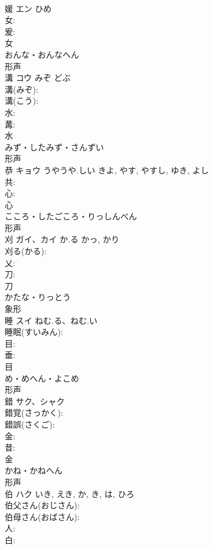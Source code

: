 \documentclass[8pt]{extreport}
\begin{document}
\begin{CJK}{UTF8}{min}
\\	媛	エン	ひめ		
\\	女: 
\\	爰: 
\\	女	
\\	おんな・おんなへん	
\\	形声 
\\	溝	コウ	みぞ	どぶ	
\\	溝(みぞ): 
\\	溝(こう): 
\\	水: 
\\	冓: 
\\	水	
\\	みず・したみず・さんずい	
\\	形声 
\\	恭	キョウ	うやうや.しい	きよ, やす, やすし, ゆき, よし	
\\	共: 
\\	心: 
\\	心	
\\	こころ・したごころ・りっしんべん	
\\	形声 
\\	刈	ガイ、カイ	か.る	かっ, かり	
\\	刈る(かる): 
\\	乂: 
\\	刀: 
\\	刀	
\\	かたな・りっとう	
\\	象形 
\\	睡	スイ	ねむ.る、ねむ.い		
\\	睡眠(すいみん): 
\\	目: 
\\	垂: 
\\	目	
\\	め・めへん・よこめ	
\\	形声 
\\	錯	サク、シャク			
\\	錯覚(さっかく): 
\\	錯誤(さくご): 
\\	金: 
\\	昔: 
\\	金	
\\	かね・かねへん	
\\	形声 
\\	伯	ハク		いき, えき, か, き, は, ひろ	
\\	伯父さん(おじさん): 
\\	伯母さん(おばさん): 
\\	人: 
\\	白: 

\end{CJK}
\end{document}
